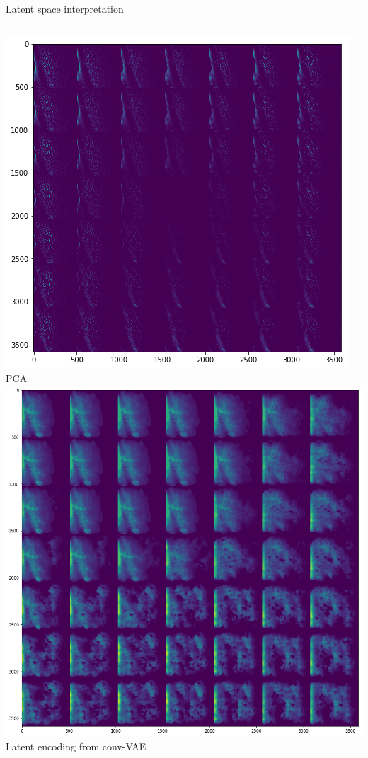 \begin{frame}{ Latent space interpretation }{ }
	\begin{columns}
		\includegraphics[width=\textwidth]{media/dai_pca.png}
		PCA
		\includegraphics[width=\textwidth]{media/voltage_latent}
		Latent encoding from conv-VAE
\end{columns}
\end{frame}{}
